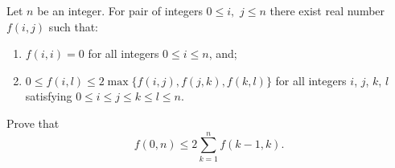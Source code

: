 Let $n$ be an integer. For pair of integers $0 \leq i,$ $j\leq n$ there exist real number $f(i,j)$ such that:
\begin{enumerate}
  \item $ f(i,i)=0$ for all integers $0\leq i \leq n$, and;
  \item $0\leq f(i,l) \leq 2\max \{ f(i,j), f(j,k), f(k,l) \}$ for all integers $i$, $j$, $k$, $l$ satisfying $0\leq i\leq j\leq k\leq l\leq n$.
\end{enumerate}

Prove that $$f(0,n) \leq 2\sum_{k=1}^{n}f(k-1,k).$$
